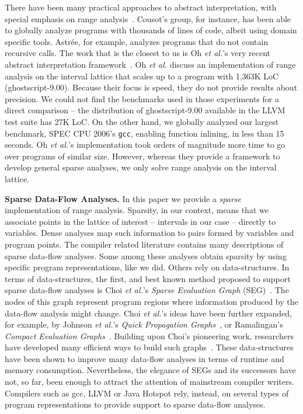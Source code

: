 \documentclass[preprint]{elsarticle}
\begin{document}
There have been many practical approaches to abstract interpretation,
with special emphasis on range analysis~\cite{Gampe11,Blanchet03,Bertrane10,Cousot09,Jung05}.
Cousot's group, for instance, has been able to globally analyze programs with
thousands of lines of code, albeit using domain specific tools.
Astr\'{e}e, for example, analyzes programs that do not contain recursive calls.
The work that is the closest to us is Oh {\em et al.}'s very recent abstract
interpretation framework~\cite{Oh12}.
Oh {\em et al.} discuss an implementation of range analysis on the interval
lattice that scales up to a program with 1,363K LoC (ghostscript-9.00).
Because their focus is speed, they do not provide results about precision.
We could not find the benchmarks used in those experiments for a
direct comparison -- the distribution of ghostscript-9.00 available in the
LLVM test suite has 27K LoC.
On the other hand, we globally analyzed our largest benchmark, SPEC CPU 2006's
\texttt{gcc}, enabling function inlining, in less than 15 seconds.
Oh {\em et al.}'s implementation took orders of magnitude more time to go over
programs of similar size.
However, whereas they provide a framework to develop general sparse analyses, we
only solve range analysis on the interval lattice.

\noindent
\textbf{Sparse Data-Flow Analyses. }
In this paper we provide a {\em sparse} implementation of range analysis.
Sparsity, in our context, means that we associate points in the lattice of
interest -- intervals in our case -- directly to variables.
Dense analyses map such information to pairs formed by variables and program
points.
The compiler related literature contains many descriptions of sparse
data-flow analyses.
Some among these analyses obtain sparsity by using specific program
representations, like we did.
Others rely on data-structures.
In terms of data-structures, the first, and best known method proposed to
support sparse data-flow analyses is Choi {\em et al.}'s {\em Sparse Evaluation
Graph} (SEG)~\cite{Choi91}.
The nodes of this graph represent program regions where information produced by
the data-flow analysis might change.
Choi {\em et al.}'s ideas have been further expanded, for example, by Johnson
{\em et al.}'s {\em Quick Propagation Graphs}~\cite{Johnson93}, or Ramalingan's
{\em Compact Evaluation Graphs}~\cite{Ramalingan02}.
Building upon Choi's pioneering work, researchers have developed many
efficient ways to build such graphs~\cite{Pingali95,Pingali97,Johnson94}.
These data-structures have been shown to improve many data-flow analyses in
terms of runtime and memory consumption.
Nevertheless, the elegance of SEGs and its successors have not, so far, been
enough to attract the attention of mainstream compiler writers.
Compilers such as gcc, LLVM or Java Hotspot rely, instead, on several types of
program representations to provide support to sparse data-flow analyses.
\end{document}
